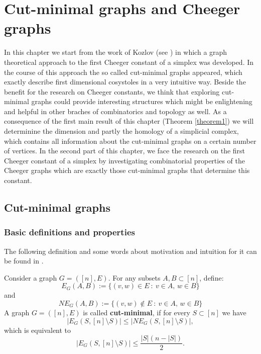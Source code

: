 
\chapter{Cut-minimal graphs and Cheeger graphs}

\label{Chapter3}

In this chapter we start from the work of Kozlov (see \cite{1}) in which a graph theoretical approach to the first Cheeger constant of a simplex was developed. In the course of this approach the so called cut-minimal graphs appeared, which exactly describe first dimensional cosystoles in a very intuitive way. Beside the benefit for the research on Cheeger constants, we think that exploring cut-minimal graphs could provide interesting structures which might be enlightening and helpful in other braches of combinatorics and topology as well. As a consequence of the first main result of this chapter (Theorem \ref{theorem1}) we will determinine the dimension and partly the homology of a simplicial complex, which contains all information about the cut-minimal graphs on a certain number of vertices. In the second part of this chapter, we face the research on the first Cheeger constant of a simplex by investigating combinatorial properties of the Cheeger graphs which are exactly those cut-minimal graphs that determine this constant.

\section{Cut-minimal graphs}


\subsection{Basic definitions and properties}
The following definition and some words about motivation and intuition for it can be found in \cite{1}.

\begin{defi}
Consider a graph \(G=([n],E)\). For any subsets \(A,B\subset [n]\), define:
\[
E_G(A,B):=\{(v,w)\in E\: :\: v\in A\text{, }w\in B\}
\]
and
\[
NE_G(A,B):=\{(v,w)\notin E\: :\: v\in A\text{, }w\in B\}
\]
A graph \(G=([n],E)\) is called \textbf{cut-minimal}, if for every \(S\subset[n]\) we have
\[
|E_G(S,[n]\setminus S)|\leq |NE_G(S,[n]\setminus S)|,
\]
which is equivalent to
\[
|E_G(S,[n]\setminus S)|\leq\frac{|S|(n-|S|)}{2}.
\]
\end{defi}

